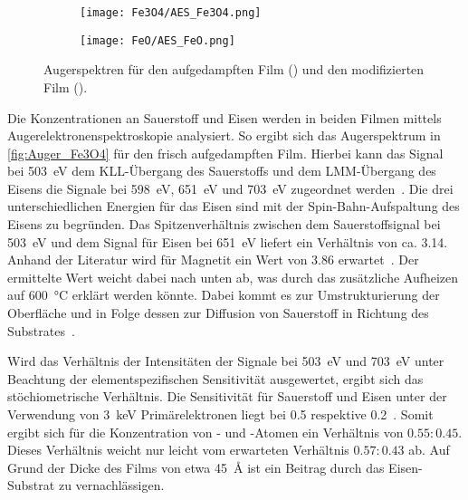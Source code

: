         \begin{figure}
            \centering
            \begin{subfigure}[t]{0.48\textwidth}
                \centering
                \texttt{[image: Fe3O4/AES\_Fe3O4.png]}
                \subcaption{}
                \label{fig:Auger_Fe3O4}
            \end{subfigure}
            \begin{subfigure}[t]{0.48\textwidth}
                \centering
                \texttt{[image: FeO/AES\_FeO.png]}
                \subcaption{}
                \label{fig:Auger_FeO}
            \end{subfigure}
            \caption{Augerspektren für den aufgedampften Film () und den modifizierten Film ().}
            \label{fig:Auger}
        \end{figure}
        Die Konzentrationen an Sauerstoff und Eisen werden in beiden Filmen mittels Augerelektronenspektroskopie analysiert.
        So ergibt sich das Augerspektrum in \autoref{fig:Auger_Fe3O4} für den frisch aufgedampften Film.
        Hierbei kann das Signal bei \SI{503}{\electronvolt} dem KLL-Übergang des Sauerstoffs und dem LMM-Übergang des Eisens die Signale bei \SI{598}{\electronvolt}, \SI{651}{\electronvolt} und \SI{703}{\electronvolt} zugeordnet werden~\cite{Auger}. 
        Die drei unterschiedlichen Energien für das Eisen sind mit der Spin-Bahn-Aufspaltung des Eisens zu begründen.
        Das Spitzenverhältnis zwischen dem Sauerstoffsignal bei \SI{503}{\electronvolt} und dem Signal für Eisen bei \SI{651}{\electronvolt} liefert ein Verhältnis von ca. \num{3.14}.
        Anhand der Literatur wird für Magnetit ein Wert von \num{3.86} erwartet~\cite{FeO_1}.
        Der ermittelte Wert weicht dabei nach unten ab, was durch das zusätzliche Aufheizen auf \SI{600}{\celsius} erklärt werden könnte.
        Dabei kommt es zur Umstrukturierung der Oberfläche und in Folge dessen zur Diffusion von Sauerstoff in Richtung des Substrates~\cite{FeO_62}.

        Wird das Verhältnis der Intensitäten der Signale bei \SI{503}{\electronvolt} und \SI{703}{\electronvolt} unter Beachtung der elementspezifischen Sensitivität ausgewertet, ergibt sich das stöchiometrische Verhältnis.
        Die Sensitivität für Sauerstoff und Eisen unter der Verwendung von \SI{3}{\kilo\electronvolt} Primärelektronen liegt bei \num{0.5} respektive \num{0.2}~\cite{Auger}.
        Somit ergibt sich für die Konzentration von - und -Atomen ein Verhältnis von $\num{0.55}:\num{0.45}$.
        Dieses Verhältnis weicht nur leicht vom erwarteten Verhältnis $\num{0.57}:\num{0.43}$ ab.
        Auf Grund der Dicke des Films von etwa \SI{45}{\angstrom} ist ein Beitrag durch das Eisen-Substrat zu vernachlässigen.

